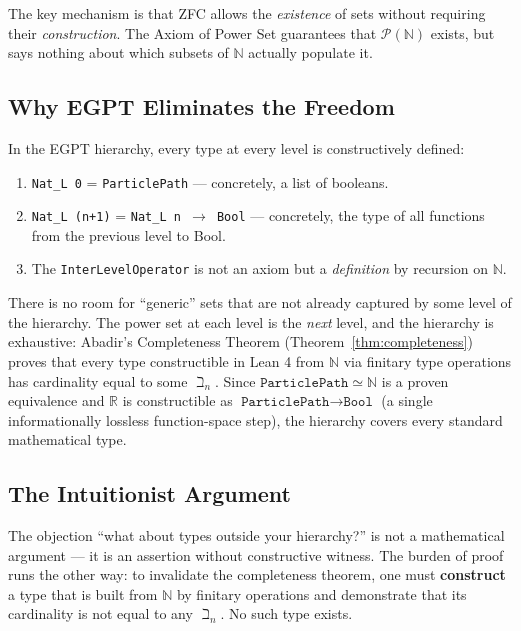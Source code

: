 \documentclass{report}
\begin{document}
The key mechanism is that ZFC allows the \emph{existence} of sets without
requiring their \emph{construction}. The Axiom of Power Set guarantees that
$\mathcal{P}(\mathbb{N})$ exists, but says nothing about which subsets of
$\mathbb{N}$ actually populate it.

\subsection{Why EGPT Eliminates the Freedom}

In the EGPT hierarchy, every type at every level is constructively defined:

\begin{enumerate}
\item \texttt{Nat\_L 0} = \texttt{ParticlePath} --- concretely, a list of
booleans.
\item \texttt{Nat\_L (n+1)} = \texttt{Nat\_L n $\to$ Bool} --- concretely,
the type of all functions from the previous level to Bool.
\item The \texttt{InterLevelOperator} is not an axiom but a \emph{definition}
by recursion on $\mathbb{N}$.
\end{enumerate}

There is no room for ``generic'' sets that are not already captured by some
level of the hierarchy. The power set at each level is the \emph{next} level,
and the hierarchy is exhaustive: Abadir's Completeness Theorem
(Theorem~\ref{thm:completeness}) proves that every type constructible in
Lean 4 from $\mathbb{N}$ via finitary type operations has cardinality equal
to some $\beth_n$. Since $\texttt{ParticlePath} \simeq \mathbb{N}$ is a proven
equivalence and $\mathbb{R}$ is constructible as $\texttt{ParticlePath} \to
\texttt{Bool}$ (a single informationally lossless function-space step), the
hierarchy covers every standard mathematical type.

\subsection{The Intuitionist Argument}

The objection ``what about types outside your hierarchy?'' is not a
mathematical argument --- it is an assertion without constructive witness.
The burden of proof runs the other way: to invalidate the completeness
theorem, one must \textbf{construct} a type that is built from $\mathbb{N}$
by finitary operations and demonstrate that its cardinality is not equal to
any $\beth_n$. No such type exists.
\end{document}
